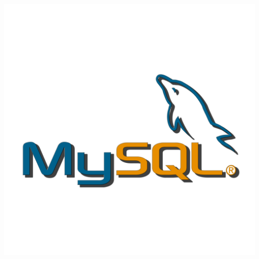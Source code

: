 \documentclass{article}
\begin{document}
\includegraphics[width=\linewidth]{mysql.png}
\end{document}
